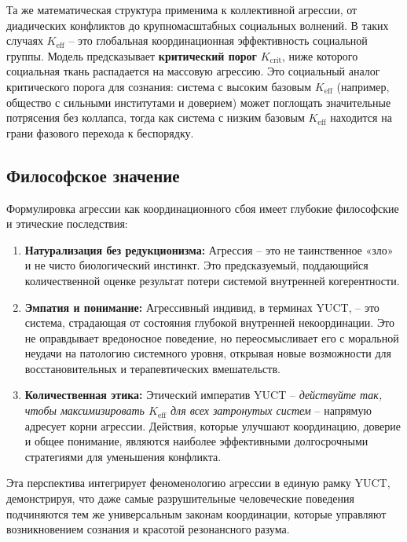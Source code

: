 \documentclass[12pt,a4paper]{article}
\begin{document}
	Та же математическая структура применима к коллективной агрессии, от диадических конфликтов до крупномасштабных социальных волнений. В таких случаях \(K_{\mathrm{eff}}\) – это глобальная координационная эффективность социальной группы. Модель предсказывает \textbf{критический порог} \(K_{\mathrm{crit}}\), ниже которого социальная ткань распадается на массовую агрессию. Это социальный аналог критического порога для сознания: система с высоким базовым \(K_{\mathrm{eff}}\) (например, общество с сильными институтами и доверием) может поглощать значительные потрясения без коллапса, тогда как система с низким базовым \(K_{\mathrm{eff}}\) находится на грани фазового перехода к беспорядку.
	
	\subsection{Философское значение}
	
	Формулировка агрессии как координационного сбоя имеет глубокие философские и этические последствия:
	
	\begin{enumerate}
		\item \textbf{Натурализация без редукционизма:} Агрессия – это не таинственное «зло» и не чисто биологический инстинкт. Это предсказуемый, поддающийся количественной оценке результат потери системой внутренней когерентности.
		\item \textbf{Эмпатия и понимание:} Агрессивный индивид, в терминах YUCT, – это система, страдающая от состояния глубокой внутренней некоординации. Это не оправдывает вредоносное поведение, но переосмысливает его с моральной неудачи на патологию системного уровня, открывая новые возможности для восстановительных и терапевтических вмешательств.
		\item \textbf{Количественная этика:} Этический императив YUCT – \textit{действуйте так, чтобы максимизировать \(K_{\mathrm{eff}}\) для всех затронутых систем} – напрямую адресует корни агрессии. Действия, которые улучшают координацию, доверие и общее понимание, являются наиболее эффективными долгосрочными стратегиями для уменьшения конфликта.
	\end{enumerate}
	
	Эта перспектива интегрирует феноменологию агрессии в единую рамку YUCT, демонстрируя, что даже самые разрушительные человеческие поведения подчиняются тем же универсальным законам координации, которые управляют возникновением сознания и красотой резонансного разума.
	
\end{document}
